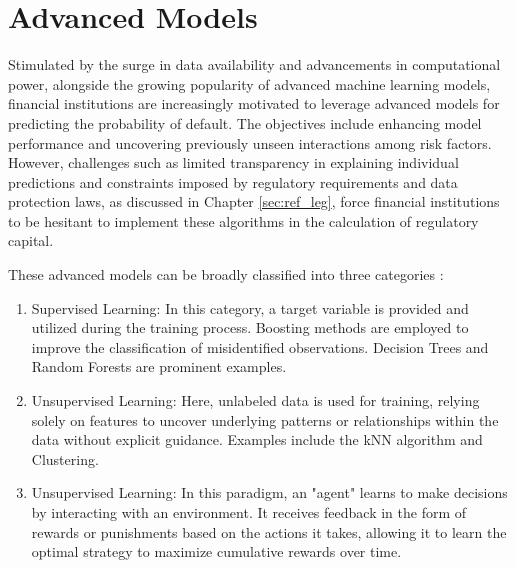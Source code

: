 \chapter{Advanced Models}

Stimulated by the surge in data availability and advancements in computational power, alongside the growing popularity of advanced machine learning models, financial institutions are increasingly motivated to leverage advanced models for predicting the probability of default. The objectives include enhancing model performance and uncovering previously unseen interactions among risk factors. However, challenges such as limited transparency in explaining individual predictions and constraints imposed by regulatory requirements and data protection laws, as discussed in Chapter \ref{sec:ref_leg}, force financial institutions to be hesitant to implement these algorithms in the calculation of regulatory capital. \cite[p. 4]{EBA:2023}

These advanced models can be broadly classified into three categories \cite[p. 43-45]{Roberts2022}:

\begin{enumerate}
  \item Supervised Learning: In this category, a target variable is provided and utilized during the training process. Boosting methods are employed to improve the classification of misidentified observations. Decision Trees and Random Forests are prominent examples.
\item Unsupervised Learning: Here, unlabeled data is used for training, relying solely on features to uncover underlying patterns or relationships within the data without explicit guidance. Examples include the kNN algorithm and Clustering.
\item Unsupervised Learning: In this paradigm, an "agent" learns to make decisions by interacting with an environment. It receives feedback in the form of rewards or punishments based on the actions it takes, allowing it to learn the optimal strategy to maximize cumulative rewards over time.
\end{enumerate}

